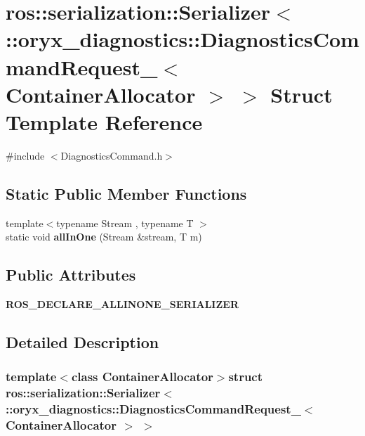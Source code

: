 \section{ros\-:\-:serialization\-:\-:\-Serializer$<$ \-:\-:oryx\-\_\-diagnostics\-:\-:\-Diagnostics\-Command\-Request\-\_\-$<$ \-Container\-Allocator $>$ $>$ \-Struct \-Template \-Reference}
\label{structros_1_1serialization_1_1Serializer_3_01_1_1oryx__diagnostics_1_1DiagnosticsCommandRequest_6c568f0abfd80cbe862c3f3c749801ee}


{\ttfamily \#include $<$\-Diagnostics\-Command.\-h$>$}

\subsection*{\-Static \-Public \-Member \-Functions}
\begin{DoxyCompactItemize}
\item 
{\footnotesize template$<$typename Stream , typename T $>$ }\\static void {\bf all\-In\-One} (\-Stream \&stream, \-T m)
\end{DoxyCompactItemize}
\subsection*{\-Public \-Attributes}
\begin{DoxyCompactItemize}
\item 
{\bf \-R\-O\-S\-\_\-\-D\-E\-C\-L\-A\-R\-E\-\_\-\-A\-L\-L\-I\-N\-O\-N\-E\-\_\-\-S\-E\-R\-I\-A\-L\-I\-Z\-E\-R}
\end{DoxyCompactItemize}


\subsection{\-Detailed \-Description}
\subsubsection*{template$<$class Container\-Allocator$>$struct ros\-::serialization\-::\-Serializer$<$ \-::oryx\-\_\-diagnostics\-::\-Diagnostics\-Command\-Request\-\_\-$<$ Container\-Allocator $>$ $>$}




